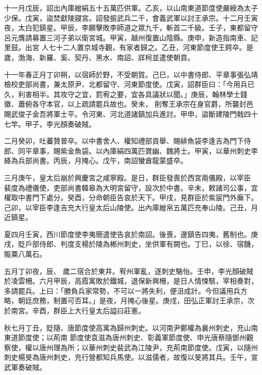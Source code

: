 \begin{pinyinscope}
 十一月戊辰，詔出內庫繒絹五十五萬匹供軍。乙亥，以山南東道節度使嚴綬為太子少保。戊寅，盜焚獻陵寢宮。詔發振武兵二千，會義武軍以討王承宗。十二月壬寅夜，太白犯鎮星。甲辰，李願擊敗李師道之眾九千，斬首二千級。壬子，東都留守呂元膺請募置三河子弟以衛宮城。甲寅，越州復置山陰縣。庚申，新造指南車、記里鼓。出宮
 人七十二人置京城寺觀，有家者歸之。乙丑，河東節度使王鍔卒。是歲，渤海、新羅、奚、契丹、黑水、南詔、牂柯並遣使朝貢。



 十一年春正月丁卯朔，以宿師於野，不受朝賀。己巳，以中書侍郎、平章事張弘靖檢校吏部尚書，兼太原尹、北都留守、河東節度使。戊寅，詔群臣曰：「今用兵已久，利害相半。其攻守之宜，罰宥之要，宜各具議狀以聞。」庚辰，翰林學士錢徽、蕭俯各守本官，以上疏請罷兵故也。癸未，
 削奪王承宗在身官爵，所襲封邑賜武俊子金吾將軍士平。令河東、河北道諸鎮加兵進討。甲申，盜斷建陵門戟四十七竿。甲子，李光顏奏破賊。



 二月癸卯，吐蕃贊普卒。以中書舍人、權知禮部貢舉、賜緋魚袋李逢吉為門下侍郎、同平章事，賜紫金魚袋。以內庫絹四萬匹賞幽、魏將士。甲寅，以華州刺史李絳為兵部尚書。丙辰，月掩心。戊午，南詔蠻酋龍蒙盛卒。



 三月庚午，皇太后崩於興慶宮之咸寧殿。是日，群臣發喪於西宮兩儀殿，以宰臣
 裴度為禮儀使，吏部尚書韓皋為大明宮留守，設次於中書。辛未，敕諸司公事，宜權取中書門下處分。癸酉，分命朝臣告哀於天下。甲戌，見群臣於紫宸門外廡下。己卯，以宰臣李逢吉充大行皇太后山陵使。出內庫繒帛五萬匹充奉山陵。己丑，月近鎮星。



 夏四月壬寅，西川節度使李夷簡遣使告哀於南詔。後喪，邊鎮告四夷，舊制也。庚戌，貶戶部侍郎、判度支楊於陵為郴州刺史，坐供軍有闕也。丁巳，以徐、宿饑，賑粟八萬石。



 五月丁卯夜，辰、
 歲二宿合於東井。宥州軍亂，逐刺史駱怡。壬申，李光顏破賊於凌雲柵。六月甲辰，高霞寓敗於鐵城，退保新興柵，是日人情悚駭，宰相奏對，多請罷兵。上曰：「勝負兵家常勢，不可以一將失利，便沮成計。今但議用兵方略，朝廷庶務，制置可否耳。」是夜，月掩心後星。庚戌，田弘正軍討王承宗，次於南宮。辛酉，群臣上大行皇太后謚曰莊憲。



 秋七月丁丑，貶隨、唐節度使高寓為歸州刺史。以河南尹鄭權為襄州刺史，充山南東道節度使；以荊南
 節度使袁滋為唐州刺史、彰義軍節度使、申光唐蔡隨鄧州觀察使，權以唐州理為所；以華州刺史裴武為江陵尹，充荊南節度使。戊寅，以隨州刺史楊旻為唐州刺史，充行營都知兵馬使。以滋儒者，故復以旻將其兵。壬午，宣武軍奏破賊。




\end{pinyinscope}
